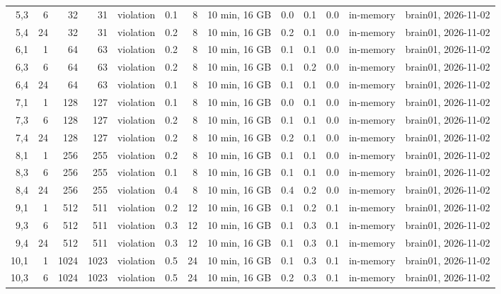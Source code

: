 \documentclass[10pt]{article}
\begin{document}
\begin{longtable}{@{}rrrrlrrlrrrrl@{}}
\color{red} 5,3 & 6 & 32 & 31 & violation & 0.1 & 8 & 10 min, 16 GB & 0.0 & 0.1 & 0.0 & in-memory & brain01, 2026-11-02 \\
\color{red} 5,4 & 24 & 32 & 31 & violation & 0.2 & 8 & 10 min, 16 GB & 0.2 & 0.1 & 0.0 & in-memory & brain01, 2026-11-02 \\
\color{red} 6,1 & 1 & 64 & 63 & violation & 0.2 & 8 & 10 min, 16 GB & 0.1 & 0.1 & 0.0 & in-memory & brain01, 2026-11-02 \\
\color{red} 6,3 & 6 & 64 & 63 & violation & 0.2 & 8 & 10 min, 16 GB & 0.1 & 0.2 & 0.0 & in-memory & brain01, 2026-11-02 \\
\color{red} 6,4 & 24 & 64 & 63 & violation & 0.1 & 8 & 10 min, 16 GB & 0.1 & 0.1 & 0.0 & in-memory & brain01, 2026-11-02 \\
\color{red} 7,1 & 1 & 128 & 127 & violation & 0.1 & 8 & 10 min, 16 GB & 0.0 & 0.1 & 0.0 & in-memory & brain01, 2026-11-02 \\
\color{red} 7,3 & 6 & 128 & 127 & violation & 0.2 & 8 & 10 min, 16 GB & 0.1 & 0.1 & 0.0 & in-memory & brain01, 2026-11-02 \\
\color{red} 7,4 & 24 & 128 & 127 & violation & 0.2 & 8 & 10 min, 16 GB & 0.2 & 0.1 & 0.0 & in-memory & brain01, 2026-11-02 \\
\color{red} 8,1 & 1 & 256 & 255 & violation & 0.2 & 8 & 10 min, 16 GB & 0.1 & 0.1 & 0.0 & in-memory & brain01, 2026-11-02 \\
\color{red} 8,3 & 6 & 256 & 255 & violation & 0.1 & 8 & 10 min, 16 GB & 0.1 & 0.1 & 0.0 & in-memory & brain01, 2026-11-02 \\
\color{red} 8,4 & 24 & 256 & 255 & violation & 0.4 & 8 & 10 min, 16 GB & 0.4 & 0.2 & 0.0 & in-memory & brain01, 2026-11-02 \\
\color{red} 9,1 & 1 & 512 & 511 & violation & 0.2 & 12 & 10 min, 16 GB & 0.1 & 0.2 & 0.1 & in-memory & brain01, 2026-11-02 \\
\color{red} 9,3 & 6 & 512 & 511 & violation & 0.3 & 12 & 10 min, 16 GB & 0.1 & 0.3 & 0.1 & in-memory & brain01, 2026-11-02 \\
\color{red} 9,4 & 24 & 512 & 511 & violation & 0.3 & 12 & 10 min, 16 GB & 0.1 & 0.3 & 0.1 & in-memory & brain01, 2026-11-02 \\
\color{red} 10,1 & 1 & 1024 & 1023 & violation & 0.5 & 24 & 10 min, 16 GB & 0.1 & 0.3 & 0.1 & in-memory & brain01, 2026-11-02 \\
\color{red} 10,3 & 6 & 1024 & 1023 & violation & 0.5 & 24 & 10 min, 16 GB & 0.2 & 0.3 & 0.1 & in-memory & brain01, 2026-11-02 \\

\end{longtable}
\end{document}
